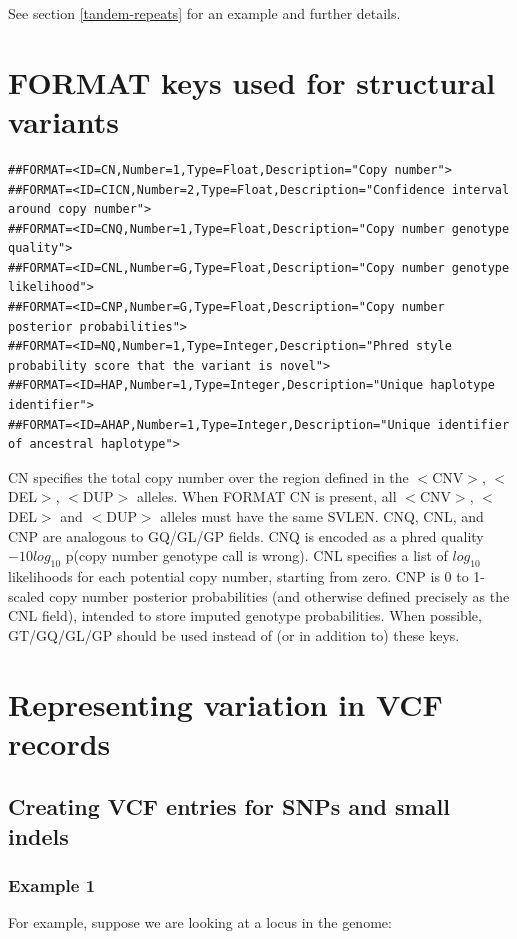 \documentclass[8pt]{article}
\begin{document}
See section \ref{tandem-repeats} for an example and further details.

\section{FORMAT keys used for structural variants}
\label{sv-format-keys}
\footnotesize
\begin{verbatim}
##FORMAT=<ID=CN,Number=1,Type=Float,Description="Copy number">
##FORMAT=<ID=CICN,Number=2,Type=Float,Description="Confidence interval around copy number">
##FORMAT=<ID=CNQ,Number=1,Type=Float,Description="Copy number genotype quality">
##FORMAT=<ID=CNL,Number=G,Type=Float,Description="Copy number genotype likelihood">
##FORMAT=<ID=CNP,Number=G,Type=Float,Description="Copy number posterior probabilities">
##FORMAT=<ID=NQ,Number=1,Type=Integer,Description="Phred style probability score that the variant is novel">
##FORMAT=<ID=HAP,Number=1,Type=Integer,Description="Unique haplotype identifier">
##FORMAT=<ID=AHAP,Number=1,Type=Integer,Description="Unique identifier of ancestral haplotype">
\end{verbatim}
\normalsize
CN specifies the total copy number over the region defined in the $<$CNV$>$, $<$DEL$>$, $<$DUP$>$ alleles.
When FORMAT CN is present, all $<$CNV$>$, $<$DEL$>$ and $<$DUP$>$ alleles must have the same SVLEN.
CNQ, CNL, and CNP are analogous to GQ/GL/GP fields.
CNQ is encoded as a phred quality $-10log_{10}$ p(copy number genotype call is wrong).
CNL specifies a list of $log_{10}$ likelihoods for each potential copy number, starting from zero.
CNP is 0 to 1-scaled copy number posterior probabilities (and otherwise defined precisely as the CNL field), intended to store imputed genotype probabilities.
When possible, GT/GQ/GL/GP should be used instead of (or in addition to) these keys.

\section{Representing variation in VCF records}
\subsection{Creating VCF entries for SNPs and small indels}
\subsubsection{Example 1}
For example, suppose we are looking at a locus in the genome:
\end{document}
